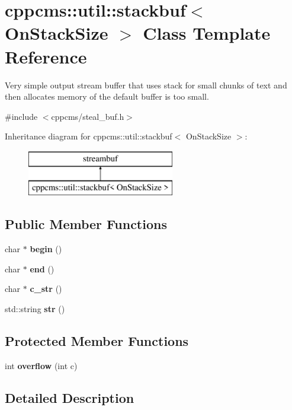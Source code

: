 \section{cppcms\-:\-:util\-:\-:stackbuf$<$ On\-Stack\-Size $>$ Class Template Reference}
\label{classcppcms_1_1util_1_1stackbuf}


Very simple output stream buffer that uses stack for small chunks of text and then allocates memory of the default buffer is too small.  




{\ttfamily \#include $<$cppcms/steal\-\_\-buf.\-h$>$}

Inheritance diagram for cppcms\-:\-:util\-:\-:stackbuf$<$ On\-Stack\-Size $>$\-:\begin{figure}[H]
\begin{center}
\leavevmode
\includegraphics[height=2.000000cm]{classcppcms_1_1util_1_1stackbuf}
\end{center}
\end{figure}
\subsection*{Public Member Functions}
\begin{DoxyCompactItemize}
\item 
char $\ast$ {\bf begin} ()
\item 
char $\ast$ {\bf end} ()
\item 
char $\ast$ {\bf c\-\_\-str} ()
\item 
std\-::string {\bf str} ()
\end{DoxyCompactItemize}
\subsection*{Protected Member Functions}
\begin{DoxyCompactItemize}
\item 
int {\bfseries overflow} (int c)\label{classcppcms_1_1util_1_1stackbuf_a52cd01fae4eae067e0363a21814afebb}

\end{DoxyCompactItemize}


\subsection{Detailed Description}
